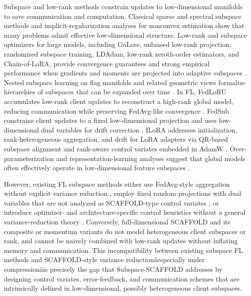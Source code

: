 \documentclass[11pt]{article}
\begin{document}
Subspace and low-rank methods constrain updates to low-dimensional manifolds to save communication and computation. Classical sparse and spectral subspace methods \citep{Yang2015LearningW, xu2023determine} and implicit-regularization analyses for nonconvex estimation \citep{Ma2017ImplicitRI} show that many problems admit effective low-dimensional structure. Low-rank and subspace optimizers for large models, including GaLore, unbiased low-rank projection, randomized subspace training, LDAdam, low-rank zeroth-order estimators, and Chain-of-LoRA, provide convergence guarantees and strong empirical performance when gradients and moments are projected into adaptive subspaces \citep{Zhao2024GaLoreML, pan2025unbiased, he2024subspace, Chen2025AME, Robert2024LDAdamAO, chen2024enhancing, chen2024enhancing, xia2024chain}. Nested subspace learning on flag manifolds and related geometric views formalize hierarchies of subspaces that can be expanded over time \citep{szwagier2025nested}. In FL, FedLoRU accumulates low-rank client updates to reconstruct a high-rank global model, reducing communication while preserving FedAvg-like convergence \citep{Park2024CommunicationEfficientFL}. FedSub constrains client updates to a fixed low-dimensional projection and uses low-dimensional dual variables for drift correction \citep{zhang2025efficient}. ILoRA addresses initialization, rank-heterogeneous aggregation, and drift for LoRA adapters via QR-based subspace alignment and rank-aware control variates embedded in AdamW \citep{Zhou2025ILoRAFL}. Over-parameterization and representation-learning analyses suggest that global models often effectively operate in low-dimensional feature subspaces \citep{collins2022fedavg, su2023non}.

However, existing FL subspace methods either use FedAvg-style aggregation without explicit variance reduction \citep{Park2024CommunicationEfficientFL}, employ fixed random projections with dual variables that are not analyzed as SCAFFOLD-type control variates \citep{zhang2025efficient}, or introduce optimizer- and architecture-specific control heuristics without a general variance-reduction theory \citep{Zhou2025ILoRAFL}. Conversely, full-dimensional SCAFFOLD and its composite or momentum variants \citep{karimireddy2020scaffold, Zhou2025FedCanonNC, Cheng2023MomentumBN} do not model heterogeneous client subspaces or rank, and cannot be naively combined with low-rank updates without inflating memory and communication. This incompatibility between existing subspace FL methods and SCAFFOLD-style variance reductionâespecially under compressionâis precisely the gap that Subspace-SCAFFOLD addresses by designing control variates, error-feedback, and communication schemes that are intrinsically defined in low-dimensional, possibly heterogeneous client subspaces.



\end{document}
